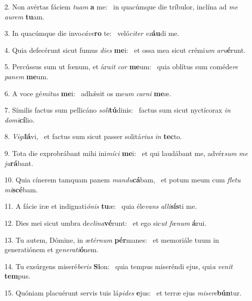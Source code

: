 2. Non avértas fáciem \textit{tu}\textit{am} \textbf{a} me: \ast\  in quacúmque die tríbulor, inclína ad \textit{me} \textit{au}\textit{rem} \textbf{tu}am.\

3. In quacúmque die invo\textit{cá}\textit{ve}\textbf{ro} te: \ast\  veló\textit{ci}\textit{ter} \textit{ex}\textbf{áu}di me.\

4. Quia defecérunt sicut fumus \textit{di}\textit{es} \textbf{me}i: \ast\  et ossa mea sicut crémi\textit{um} \textit{a}\textit{ru}\textbf{é}runt.\

5. Percússus sum ut fœnum, et áru\textit{it} \textit{cor} \textbf{me}um: \ast\  quia oblítus sum coméde\textit{re} \textit{pa}\textit{nem} \textbf{me}um.\

6. A voce gé\textit{mi}\textit{tus} \textbf{me}i: \ast\  adhǽsit os me\textit{um} \textit{car}\textit{ni} \textbf{me}æ.\

7. Símilis factus sum pellicáno \textit{so}\textit{li}\textbf{tú}dinis: \ast\  factus sum sicut nyctícorax \textit{in} \textit{do}\textit{mi}\textbf{cí}lio.\

8. \textit{Vi}\textit{gi}\textbf{lá}vi, \ast\  et factus sum sicut passer solitá\textit{ri}\textit{us} \textit{in} \textbf{tec}to.\

9. Tota die exprobrábant mihi ini\textit{mí}\textit{ci} \textbf{me}i: \ast\  et qui laudábant me, advér\textit{sum} \textit{me} \textit{ju}\textbf{rá}bant.\

10. Quia cínerem tamquam panem \textit{man}\textit{du}\textbf{cá}bam, \ast\  et potum meum cum \textit{fle}\textit{tu} \textit{mi}\textbf{scé}bam.\

11. A fácie iræ et indignati\textit{ó}\textit{nis} \textbf{tu}æ: \ast\  quia éle\textit{vans} \textit{al}\textit{li}\textbf{sís}ti me.\

12. Dies mei sicut umbra de\textit{cli}\textit{na}\textbf{vé}runt: \ast\  et ego sic\textit{ut} \textit{fœ}\textit{num} \textbf{á}rui.\

13. Tu autem, Dómine, in æ\textit{tér}\textit{num} \textbf{pér}manes: \ast\  et memoriále tuum in generatiónem et ge\textit{ne}\textit{ra}\textit{ti}\textbf{ó}nem.\

14. Tu exsúrgens miseré\textit{be}\textit{ris} \textbf{Si}on: \ast\  quia tempus miseréndi ejus, qui\textit{a} \textit{ve}\textit{nit} \textbf{tem}pus.\

15. Quóniam placuérunt servis tuis lá\textit{pi}\textit{des} \textbf{e}jus: \ast\  et terræ ejus \textit{mi}\textit{se}\textit{re}\textbf{bún}tur.\

